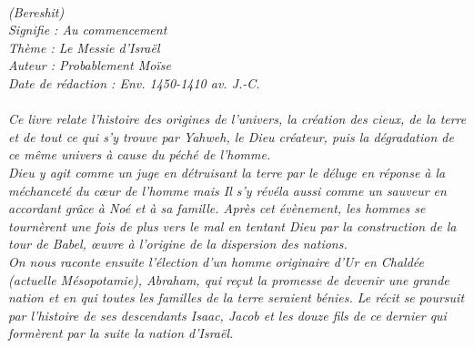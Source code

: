 \BFont
\noindent\hrulefill
{\footnotesize
\textit{
\bigskip
{\centering{}
\\(Bereshit)
\\Signifie : Au commencement
\\Thème : Le Messie d'Israël
\\Auteur : Probablement Moïse
\\Date de rédaction : Env. 1450-1410 av. J.-C.\\}
}
\textit{
\\Ce livre relate l’histoire des origines de l’univers, la création des cieux, de la terre et de tout ce qui s’y trouve par Yahweh, le Dieu créateur, puis la dégradation de ce même univers à cause du péché de l’homme.
\\Dieu y agit comme un juge en détruisant la terre par le déluge en réponse à la méchanceté du cœur de l’homme mais Il s’y révéla aussi comme un sauveur en accordant grâce à Noé et à sa famille. Après cet évènement, les hommes se tournèrent une fois de plus vers le mal en tentant Dieu par la construction de la tour de Babel, œuvre à l’origine de la dispersion des nations. 
\\On nous raconte ensuite l’élection d’un homme originaire d’Ur en Chaldée (actuelle Mésopotamie), Abraham, qui reçut la promesse de devenir une grande nation et en qui toutes les familles de la terre seraient bénies. Le récit se poursuit par l’histoire de ses descendants Isaac, Jacob et les douze fils de ce dernier qui formèrent par la suite la nation d’Israël.\bigskip
}
}
\par\nobreak\noindent\hrulefill
